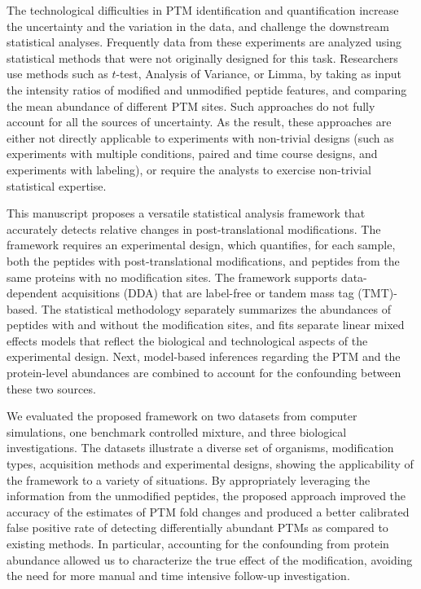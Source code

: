 \documentclass[mcp]{article}
\numberwithin{table}{section}
\begin{document}
The technological difficulties in PTM identification and quantification increase the uncertainty and the variation in the data, and challenge the downstream statistical analyses. Frequently data from these experiments are analyzed using statistical methods that were not originally designed for this task. Researchers use methods such as $t$-test\cite{Kalpic:2011}, Analysis of Variance\cite{girden:1992}, or Limma\cite{Ritchie_15a}, by taking as input the intensity ratios of modified and unmodified peptide features, and comparing the mean abundance of different PTM sites. Such approaches do not fully account for all the sources of uncertainty. As the result, these approaches are either not directly applicable to experiments with non-trivial designs (such as experiments with multiple conditions, paired and time course designs, and experiments with labeling), or require the analysts to exercise non-trivial statistical expertise.

This manuscript proposes a versatile statistical analysis framework that accurately detects relative changes in post-translational modifications. The framework requires an experimental design, which quantifies, for each sample, both the peptides with post-translational modifications, and peptides from the same proteins with no modification sites. The framework supports data-dependent acquisitions (DDA) that are label-free or tandem mass tag (TMT)-based. The statistical methodology separately summarizes the abundances of peptides with and without the modification sites, and fits separate linear mixed effects models that reflect the biological and technological aspects of the experimental design. Next, model-based inferences regarding the PTM and the protein-level abundances are combined to account for the confounding between these two sources.

We evaluated the proposed framework on two datasets from computer simulations, one benchmark controlled mixture, and three biological investigations. The datasets illustrate a diverse set of organisms, modification types, acquisition methods and experimental designs, showing the applicability of the framework to a variety of situations. By appropriately leveraging the information from the unmodified peptides, the proposed approach improved the accuracy of the estimates of PTM fold changes and produced a better calibrated false positive rate of detecting differentially abundant PTMs as compared to existing methods. In particular, accounting for the confounding from protein abundance allowed us to characterize the true effect of the modification, avoiding the need for more manual and time intensive follow-up investigation.
\end{document}
